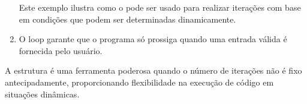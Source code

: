\documentclass[letterpaper,10pt,english]{jupyterBook}
\begin{document}
\begin{enumerate}
\sphinxAtStartPar
Este exemplo ilustra como o  pode ser usado para realizar iterações com base em condições que podem ser determinadas dinamicamente.

\item {} 
\sphinxAtStartPar
{}

\begin{sphinxVerbatim}[commandchars=\\\{\}]
  
       
      
\end{sphinxVerbatim}

\sphinxAtStartPar
O loop  garante que o programa só prossiga quando uma entrada válida é fornecida pelo usuário.

\end{enumerate}

\sphinxAtStartPar
A estrutura  é uma ferramenta poderosa quando o número de iterações não é fixo antecipadamente, proporcionando flexibilidade na execução de código em situações dinâmicas.
\end{document}
